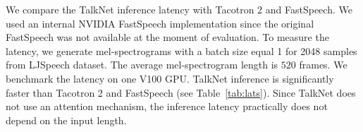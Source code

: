 We compare the TalkNet inference latency with Tacotron 2 and FastSpeech. We used an internal NVIDIA FastSpeech implementation since the original FastSpeech was not available at the moment of evaluation. To measure the latency, we generate mel-spectro\-grams with a batch size equal 1 for 2048  samples from LJSpeech dataset. The average mel-spectrogram length is $520$ frames. We benchmark the latency on one V100 GPU. TalkNet inference is significantly faster than Tacotron 2 and FastSpeech (see Table~\ref{tab:lats}). Since TalkNet  does not use an attention mechanism, the inference latency practically does not depend on the input length.

\begin{table}[!ht]
\centering
{}
\caption{TalkNet inference latency for mel-spectrogram generation (without vocoder). The latency was measured with batch size $1$ using a V100 GPU and averaged over 2048 samples from LJSpeech. Latency and Real-Time-Factor (RTF) with $95\%$ confidence interval.}
\label{tab:lats}
\end{table}